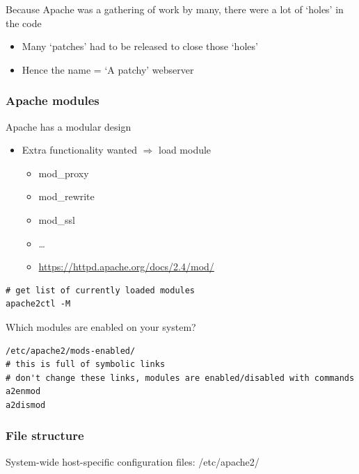 \documentclass{article}
\begin{document}
Because Apache was a gathering of work by many, there were a lot of `holes' in the code

\begin{itemize}
    \item Many `patches' had to be released to close those `holes'
    \item Hence the name = `A patchy' webserver
\end{itemize}

\subsubsection{Apache modules}

Apache has a modular design

\begin{itemize}
    \item Extra functionality wanted $\Rightarrow$ load module
    \begin{itemize}
        \item mod\_proxy
        \item mod\_rewrite
        \item mod\_ssl
        \item \dots
        \item \url{https://httpd.apache.org/docs/2.4/mod/}
    \end{itemize}
\end{itemize}

\begin{verbatim}
# get list of currently loaded modules
apache2ctl -M
\end{verbatim}

Which modules are enabled on your system?

\begin{verbatim}
/etc/apache2/mods-enabled/
# this is full of symbolic links
# don't change these links, modules are enabled/disabled with commands
a2enmod
a2dismod
\end{verbatim}

\subsubsection{File structure}

System-wide host-specific configuration files: /etc/apache2/
\end{document}
